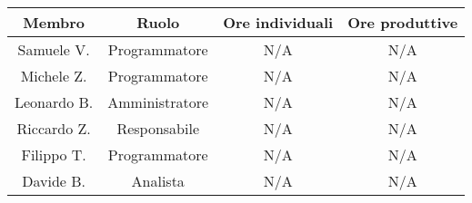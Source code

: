 \vspace{10 mm}
\begin{tabular}{|c|c|c|c|}
\hline
\textbf{Membro} & \textbf{Ruolo} & \textbf{Ore individuali} & \textbf{Ore produttive} \\
\hline
Samuele V. & Programmatore & N/A & N/A \\
\hline
Michele Z. & Programmatore & N/A & N/A \\
\hline
Leonardo B. & Amministratore & N/A & N/A \\
\hline
Riccardo Z. & Responsabile & N/A & N/A \\
\hline
Filippo T. & Programmatore & N/A & N/A \\
\hline
Davide B. & Analista & N/A & N/A \\
\hline
\end{tabular}
\vspace{10 mm}